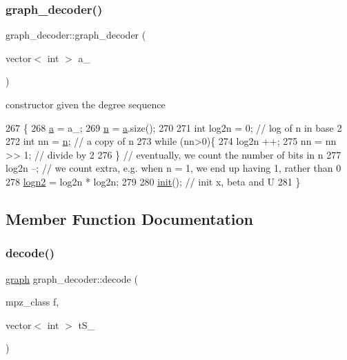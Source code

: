\subsubsection{\texorpdfstring{graph\+\_\+decoder()}{graph\_decoder()}}
{\footnotesize\ttfamily graph\+\_\+decoder\+::graph\+\_\+decoder (\begin{DoxyParamCaption}\item[{vector$<$ int $>$}]{a\+\_\+ }\end{DoxyParamCaption})}



constructor given the degree sequence 


\begin{DoxyCode}
267 \{
268   \hyperlink{classgraph__decoder_a9dd7c3c11b8a45a12cb7c3c2d2bfa2cc}{a} = a\_;
269   \hyperlink{classgraph__decoder_a6bc1e72b2f7a913d14b789a6c2d92c1e}{n} = \hyperlink{classgraph__decoder_a9dd7c3c11b8a45a12cb7c3c2d2bfa2cc}{a}.size();
270 
271   \textcolor{keywordtype}{int} log2n = 0; \textcolor{comment}{// log of n in base 2}
272   \textcolor{keywordtype}{int} nn = \hyperlink{classgraph__decoder_a6bc1e72b2f7a913d14b789a6c2d92c1e}{n}; \textcolor{comment}{// a copy of n}
273   \textcolor{keywordflow}{while} (nn>0)\{
274     log2n ++;
275     nn = nn >> 1; \textcolor{comment}{// divide by 2}
276   \} \textcolor{comment}{// eventually, we count the number of bits in n}
277   log2n --; \textcolor{comment}{// we count extra, e.g. when n = 1, we end up having 1, rather than 0}
278   \hyperlink{classgraph__decoder_a59663482843ffa5059128bd6ed866f11}{logn2} = log2n * log2n;
279 
280   \hyperlink{classgraph__decoder_a97a9dcd5af21ece86fa91adcb41ca9cc}{init}(); \textcolor{comment}{// init x, beta and U}
281 \}
\end{DoxyCode}


\subsection{Member Function Documentation}
\mbox{\label{classgraph__decoder_a3d2ef81ec6ac66e50c1809f361143922}} 
\subsubsection{\texorpdfstring{decode()}{decode()}}
{\footnotesize\ttfamily \hyperlink{classgraph}{graph} graph\+\_\+decoder\+::decode (\begin{DoxyParamCaption}\item[{mpz\+\_\+class}]{f,  }\item[{vector$<$ int $>$}]{t\+S\+\_\+ }\end{DoxyParamCaption})}



